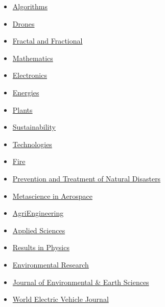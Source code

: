 \documentclass[final, a4paper, oneside, 12pt]{article}
\numberwithin{equation}{section}
\begin{document}
\begin{itemize}
    \item \href{https://www.mdpi.com/journal/algorithms/}{Algorithms}

    \item \href{https://www.mdpi.com/journal/drones/}{Drones}

    \item \href{https://www.mdpi.com/journal/fractalfract/}{Fractal and Fractional}

    \item \href{https://www.mdpi.com/journal/mathematics/}{Mathematics}

    \item \href{https://www.mdpi.com/journal/electronics/}{Electronics}

    \item \href{https://www.mdpi.com/journal/energies/}{Energies}

    \item \href{https://www.mdpi.com/journal/plants/}{Plants}

    \item \href{https://www.mdpi.com/journal/sustainability/}{Sustainability}

    \item \href{https://www.mdpi.com/journal/technologies/}{Technologies}

    \item \href{https://www.mdpi.com/journal/fire/}{Fire}

    \item \href{https://ojs.ukscip.com/index.php/ptnd/}{Prevention and Treatment of Natural Disasters}

    \item \href{https://www.aimspress.com/journal/mina/}{Metascience in Aerospace}

    \item \href{https://www.mdpi.com/journal/agriengineering/}{AgriEngineering}

    \item \href{https://www.mdpi.com/journal/applsci/}{Applied Sciences}

    \item \href{https://www.sciencedirect.com/journal/results-in-physics/}{Results in Physics}

    \item \href{https://www.sciencedirect.com/journal/environmental-research/ }{Environmental Research}
    
    \item \href{https://journals.bilpubgroup.com/index.php/jees/}{Journal of Environmental \& Earth Sciences}

    \item \href{https://www.mdpi.com/journal/wevj/}{World Electric Vehicle Journal}
    
\end{itemize}
\end{document}
